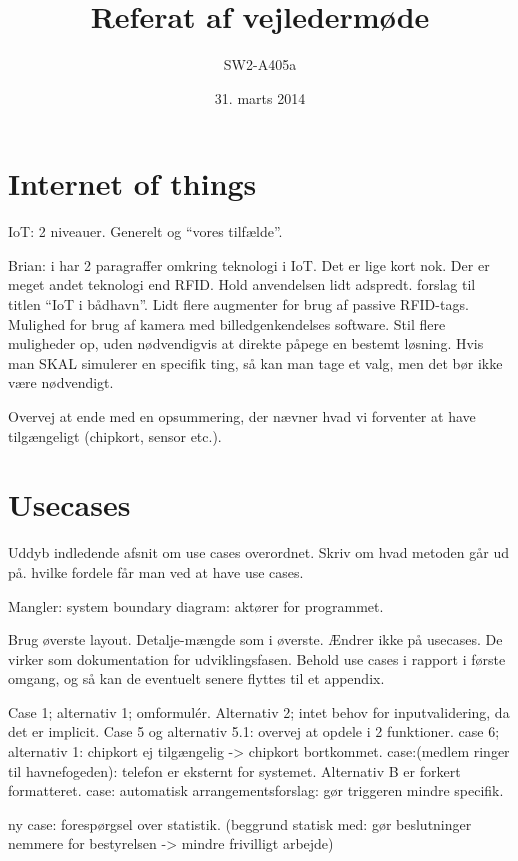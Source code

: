 \documentclass{article}
\begin{document}
\title{Referat af vejledermøde}
\author{SW2-A405a}
\date{31. marts 2014}
\maketitle
\section{Internet of things}

IoT: 2 niveauer. Generelt og \enquote{vores tilfælde}.

Brian: i har 2 paragraffer omkring teknologi i IoT. Det er lige kort nok. Der er meget andet teknologi end RFID.
Hold anvendelsen lidt adspredt. forslag til titlen \enquote{IoT i bådhavn}.
Lidt flere augmenter for brug af passive RFID-tags.
Mulighed for brug af kamera med billedgenkendelses software.
Stil flere muligheder op, uden nødvendigvis at direkte påpege en bestemt løsning. Hvis man SKAL simulerer en specifik ting, så kan man tage et valg, men det bør ikke være nødvendigt.

Overvej at ende med en opsummering, der nævner hvad vi forventer at have tilgængeligt (chipkort, sensor etc.).


\section{Usecases}

Uddyb indledende afsnit om use cases overordnet. Skriv om hvad metoden går ud på. hvilke fordele får man ved at have use cases.

Mangler: system boundary diagram: aktører for programmet.

Brug øverste layout. Detalje-mængde som i øverste. Ændrer ikke på usecases. De virker som dokumentation for udviklingsfasen. Behold use cases i rapport i første omgang, og så kan de eventuelt senere flyttes til et appendix.

Case 1; alternativ 1; omformulér. Alternativ 2; intet behov for inputvalidering, da det er implicit.
Case 5 og alternativ 5.1: overvej at opdele i 2 funktioner.
case 6; alternativ 1: chipkort ej tilgængelig -> chipkort bortkommet.
case:(medlem ringer til havnefogeden): telefon er eksternt for systemet. Alternativ B er forkert formatteret.
case: automatisk arrangementsforslag: gør triggeren mindre specifik.

ny case: forespørgsel over statistik. (beggrund statisk med: gør beslutninger nemmere for bestyrelsen -> mindre frivilligt arbejde)
\end{document}
